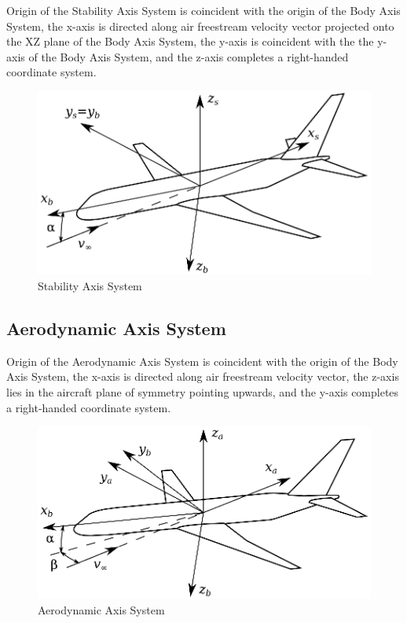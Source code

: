 Origin of the Stability Axis System is coincident with the origin of the Body Axis System, the x-axis is directed along air freestream velocity vector projected onto the XZ plane of the Body Axis System, the y-axis is coincident with the the y-axis of the Body Axis System, and the z-axis completes a right-handed coordinate system.

\begin{figure}
  \centering
  \includegraphics[width=340pt]{images/coordinate_system_Stab.eps}
  \caption{Stability Axis System}
\end{figure}

\subsection{Aerodynamic Axis System}

Origin of the Aerodynamic Axis System is coincident with the origin of the Body Axis System, the x-axis is directed along air freestream velocity vector, the z-axis lies in the aircraft plane of symmetry pointing upwards, and the y-axis completes a right-handed coordinate system.

\begin{figure}
  \centering
  \includegraphics[width=340pt]{images/coordinate_system_Aero.eps}
  \caption{Aerodynamic Axis System}
\end{figure}

